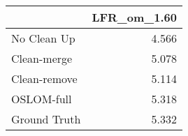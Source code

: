 \begin{tabular}{lr}
\toprule
{} & LFR_om_1.60 \\
\midrule
No Clean Up  &       4.566 \\
Clean-merge  &       5.078 \\
Clean-remove &       5.114 \\
OSLOM-full   &       5.318 \\
Ground Truth &       5.332 \\
\bottomrule
\end{tabular}
